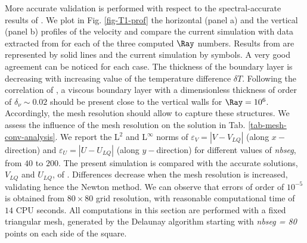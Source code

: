 More accurate validation is performed with respect to the spectral-accurate results of \cite{LeQuere91}.
We plot in Fig. \ref{fig-T1-prof} the horizontal (panel a) and the vertical (panel b)  profiles of the velocity and compare the current simulation with data extracted from  \cite{LeQuere91} for each of the three computed $\Ray$ numbers.
Results from \cite{LeQuere91} are represented by solid lines and the current simulation by symbols.
A very good agreement can  be noticed for each case.
The thickness of the boundary layer is decreasing with increasing value of the temperature difference $\delta T$.
Following the correlation of \cite{bejan2013convection}, a viscous boundary layer with a dimensionless thickness of order of $\delta_\nu \sim 0.02$ should be present close to the vertical walls for $\Ray = 10^6$.
Accordingly, the mesh resolution should allow to capture these structures.
We assess the influence of the mesh resolution on the solution in Tab. \ref{tab-mesh-conv-analysis}. 
We report the L$^2$ and L$^{\infty}$ norms of $\varepsilon_V = |V - V_{LQ}|$ (along $x-$direction)  and $\varepsilon_U = |U - U_{LQ}|$ (along $y-$direction) for different values of {\em nbseg}, from $40$ to $200$. 
The present simulation is compared with the accurate solutions, $V_{LQ}$ and $U_{LQ}$, of \cite{LeQuere91}.
Differences decrease when the mesh resolution is increased, validating hence the Newton method.
We can observe that errors of order of $10^{-5}$ is obtained from $80 \times 80$ grid resolution, with reasonable computational time of $14$ CPU seconds.
All computations in this section are performed with a fixed triangular mesh, generated by the Delaunay algorithm starting with {\em nbseg = 80} points on each side of the square.

